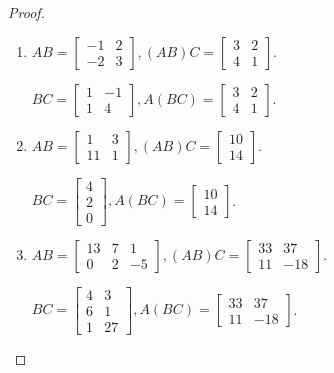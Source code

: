 \begin{proof}
    \begin{enumerate}[label={(\alph*)}]
        \item $AB = \begin{bmatrix}-1 & 2 \\ -2 & 3\end{bmatrix}, (AB)C = \begin{bmatrix}3 & 2 \\ 4 & 1\end{bmatrix}$.

              $BC = \begin{bmatrix}1 & -1 \\ 1 & 4\end{bmatrix}, A(BC) = \begin{bmatrix}3 & 2 \\ 4 & 1\end{bmatrix}$.
        \item $AB = \begin{bmatrix}1 & 3 \\ 11 & 1\end{bmatrix}, (AB)C = \begin{bmatrix}10 \\ 14\end{bmatrix}$.

              $BC = \begin{bmatrix}4 \\ 2 \\ 0\end{bmatrix}, A(BC) = \begin{bmatrix}10 \\ 14\end{bmatrix}$.
        \item $AB = \begin{bmatrix}13 & 7 & 1 \\ 0 & 2 & -5\end{bmatrix}, (AB)C = \begin{bmatrix}33 & 37 \\ 11 & -18\end{bmatrix}$.

              $BC = \begin{bmatrix}4 & 3 \\ 6 & 1 \\ 1 & 27\end{bmatrix}, A(BC) = \begin{bmatrix}33 & 37 \\ 11 & -18\end{bmatrix}$.
    \end{enumerate}
\end{proof}

